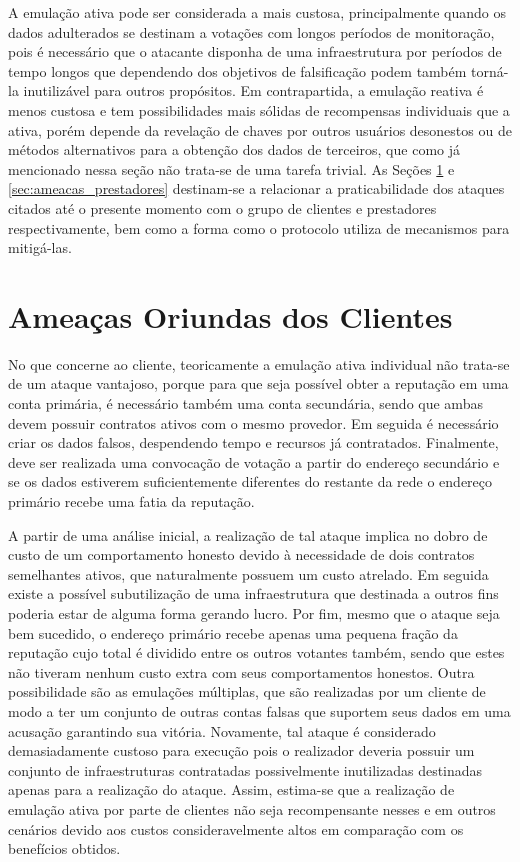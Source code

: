 A emulação ativa pode ser considerada a mais custosa, principalmente quando os dados adulterados se destinam a votações com longos períodos de monitoração, pois é necessário que o atacante disponha de uma infraestrutura por períodos de tempo longos que dependendo dos objetivos de falsificação podem também torná-la inutilizável para outros propósitos. Em contrapartida, a emulação reativa é menos custosa e tem possibilidades mais sólidas de recompensas individuais que a ativa, porém depende da revelação de chaves por outros usuários desonestos ou de métodos alternativos para a obtenção dos dados de terceiros, que como já mencionado nessa seção não trata-se de uma tarefa trivial. As Seções \ref{sec:ameacas_clientes} e \ref{sec:ameacas_prestadores} destinam-se a relacionar a praticabilidade dos ataques citados até o presente momento com o grupo de clientes e prestadores respectivamente, bem como a forma como o protocolo utiliza de mecanismos para mitigá-las.

\section{Ameaças Oriundas dos Clientes}
\label{sec:ameacas_clientes}
%
No que concerne ao cliente, teoricamente a emulação ativa individual não trata-se de um ataque vantajoso, porque para que seja possível obter a reputação em uma conta primária, é necessário também uma conta secundária, sendo que ambas devem possuir contratos ativos com o mesmo provedor. Em seguida é necessário criar os dados falsos, despendendo tempo e recursos já contratados. Finalmente, deve ser realizada uma convocação de votação a partir do endereço secundário e se os dados estiverem suficientemente diferentes do restante da rede o endereço primário recebe uma fatia da reputação.

%
A partir de uma análise inicial, a realização de tal ataque implica no dobro de custo de um comportamento honesto devido à necessidade de dois contratos semelhantes ativos, que naturalmente possuem um custo atrelado. Em seguida existe a possível subutilização de uma infraestrutura que destinada a outros fins poderia estar de alguma forma gerando lucro. Por fim, mesmo que o ataque seja bem sucedido, o endereço primário recebe apenas uma pequena fração da reputação cujo total é dividido entre os outros votantes também, sendo que estes não tiveram nenhum custo extra com seus comportamentos honestos.
%
Outra possibilidade são as emulações múltiplas, que são realizadas por um cliente de modo a ter um conjunto de outras contas falsas que suportem seus dados em uma acusação garantindo sua vitória. Novamente, tal ataque é considerado demasiadamente custoso para execução pois o realizador deveria possuir um conjunto de infraestruturas contratadas possivelmente inutilizadas destinadas apenas para a realização do ataque.
%
Assim, estima-se que a realização de emulação ativa por parte de clientes não seja recompensante nesses e em outros cenários devido aos custos consideravelmente altos em comparação com os benefícios obtidos.

